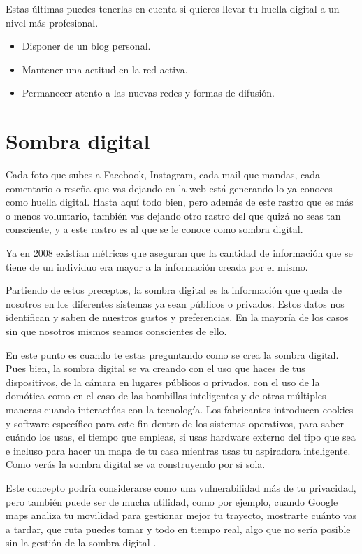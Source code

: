\documentclass[
  a4paper,
  openany]{book}
\begin{document}
Estas últimas puedes tenerlas en cuenta si quieres llevar tu huella digital a un nivel más profesional.

\begin{itemize}
\item
  Disponer de un blog personal.
\item
  Mantener una actitud en la red activa.
\item
  Permanecer atento a las nuevas redes y formas de difusión.
\end{itemize}

\hypertarget{sombra-digital}{%
\section{Sombra digital}\label{sombra-digital}}

Cada foto que subes a Facebook, Instagram, cada mail que mandas, cada comentario o reseña que vas dejando en la web está generando lo ya conoces como huella digital. Hasta aquí todo bien, pero además de este rastro que es más o menos voluntario, también vas dejando otro rastro del que quizá no seas tan consciente, y a este rastro es al que se le conoce como sombra digital.

Ya en 2008 existían métricas que aseguran que la cantidad de información que se tiene de un individuo era mayor a la información creada por el mismo.

Partiendo de estos preceptos, la sombra digital es la información que queda de nosotros en los diferentes sistemas ya sean públicos o privados. Estos datos nos identifican y saben de nuestros gustos y preferencias. En la mayoría de los casos sin que nosotros mismos seamos conscientes de ello.

En este punto es cuando te estas preguntando como se crea la sombra digital. Pues bien, la sombra digital se va creando con el uso que haces de tus dispositivos, de la cámara en lugares públicos o privados, con el uso de la domótica como en el caso de las bombillas inteligentes y de otras múltiples maneras cuando interactúas con la tecnología. Los fabricantes introducen cookies y software específico para este fin dentro de los sistemas operativos, para saber cuándo los usas, el tiempo que empleas, si usas hardware externo del tipo que sea e incluso para hacer un mapa de tu casa mientras usas tu aspiradora inteligente. Como verás la sombra digital se va construyendo por si sola.

Este concepto podría considerarse como una vulnerabilidad más de tu privacidad, pero también puede ser de mucha utilidad, como por ejemplo, cuando Google maps analiza tu movilidad para gestionar mejor tu trayecto, mostrarte cuánto vas a tardar, que ruta puedes tomar y todo en tiempo real, algo que no sería posible sin la gestión de la sombra digital \citep{XATAKA-sombra-digital}.
\end{document}
